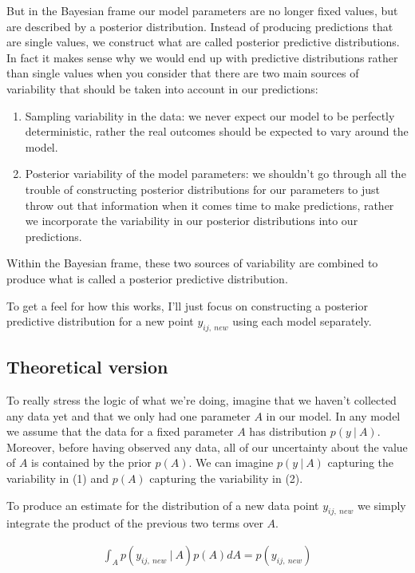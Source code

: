 \documentclass[12pt,twoside]{reedthesis}
\begin{document}
But in the Bayesian frame our model parameters are no longer fixed values, but are described by a posterior distribution. Instead of producing predictions that are single values, we construct what are called posterior predictive distributions. In fact it makes sense why we would end up with predictive distributions rather than single values when you consider that there are two main sources of variability that should be taken into account in our predictions:
\begin{enumerate}
\def\labelenumi{\arabic{enumi}.}
\item
  Sampling variability in the data: we never expect our model to be perfectly deterministic, rather the real outcomes should be expected to vary around the model.
\item
  Posterior variability of the model parameters: we shouldn't go through all the trouble of constructing posterior distributions for our parameters to just throw out that information when it comes time to make predictions, rather we incorporate the variability in our posterior distributions into our predictions.
\end{enumerate}
Within the Bayesian frame, these two sources of variability are combined to produce what is called a posterior predictive distribution.

To get a feel for how this works, I'll just focus on constructing a posterior predictive distribution for a new point \(y_{ij, \ new}\) using each model separately.

\hypertarget{theoretical-version}{%
\subsection{Theoretical version}\label{theoretical-version}}

To really stress the logic of what we're doing, imagine that we haven't collected any data yet and that we only had one parameter \(A\) in our model. In any model we assume that the data for a fixed parameter \(A\) has distribution \(p(y \ | \ A)\). Moreover, before having observed any data, all of our uncertainty about the value of \(A\) is contained by the prior \(p(A)\). We can imagine \(p(y \ | \ A)\) capturing the variability in (1) and \(p(A)\) capturing the variability in (2).

To produce an estimate for the distribution of a new data point \(y_{ij, \ new}\) we simply integrate the product of the previous two terms over \(A\).

\[
\begin{aligned}
\int_A p(y_{ij, \ new} \ | \ A)p(A )dA   = p(y_{ij, \ new} )   \\
\end{aligned}
\]
\end{document}
